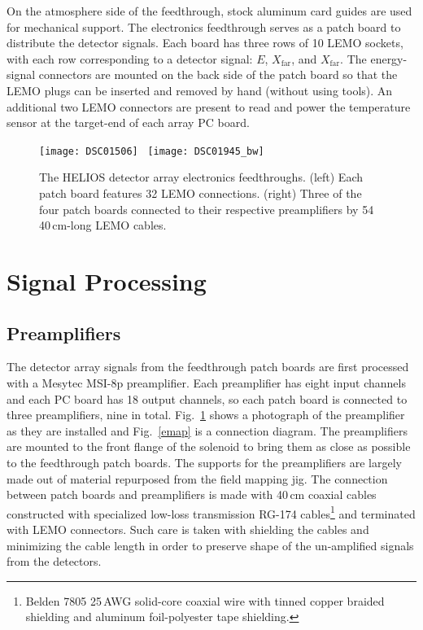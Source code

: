 On the atmosphere side of the feedthrough, stock aluminum card guides are used for mechanical support.  The electronics feedthrough serves as a patch board to distribute the detector signals.  Each board has three rows of 10 LEMO sockets, with each row corresponding to a detector signal: $E$, $X_\textrm{far}$, and $X_\textrm{far}$.  The energy-signal connectors are mounted on the back side of the patch board so that the LEMO plugs can be inserted and removed by hand (without using tools).  An additional two LEMO connectors are present to read and power the temperature sensor at the target-end of each array PC board.  
\begin{figure}[t]
\centering
\texttt{[image: DSC01506]}~
\texttt{[image: DSC01945\_bw]}
\caption[The HELIOS detector array electronics feedthroughs]{The HELIOS detector array electronics feedthroughs.  (left) Each patch board features 32 LEMO connections.  (right) Three of the four patch boards connected to their respective preamplifiers by 54 40\,cm-long LEMO cables.}%
\label{feedthrough}%
\end{figure}
\section{Signal Processing}
\subsection{Preamplifiers}
The detector array signals from the feedthrough patch boards are first processed with a Mesytec MSI-8p preamplifier.  Each preamplifier has eight input channels and each PC board has 18 output channels, so each patch board is connected to three preamplifiers, nine in total. Fig.~\ref{feedthrough} shows a photograph of the preamplifier as they are installed and Fig.~\ref{emap} is a connection diagram.  The preamplifiers are mounted to the front flange of the solenoid to bring them as close as possible to the feedthrough patch boards.  The supports for the preamplifiers are largely made out of material re\-pur\-posed from the field mapping jig.  The connection between patch boards and preamplifiers is made with 40\,cm coaxial cables constructed with specialized low-loss transmission RG-174 cables\footnote{Belden 7805 25\,AWG solid-core coaxial wire with tinned copper braided shielding and aluminum foil-polyester tape shielding.} and terminated with LEMO connectors.  Such care is taken with shielding the cables and minimizing the cable length in order to preserve shape of the un-amplified signals from the detectors.

